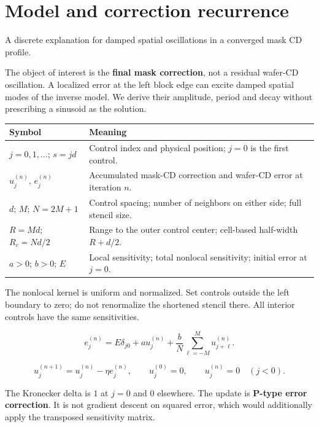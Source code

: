 \documentclass[10pt,a4paper]{article}
\newcommand{\subtitle}[1]{%
  {\small\color{muted}#1\par}\medskip}
\begin{document}
\section{Model and correction recurrence}
\subtitle{A discrete explanation for damped spatial
oscillations in a converged mask CD profile.}

The object of interest is the \textbf{final mask correction},
not a residual wafer-CD oscillation.
A localized error at the left block edge can excite damped
spatial modes of the inverse model.
We derive their amplitude, period and decay without
prescribing a sinusoid as the solution.

\begin{tabularx}{\textwidth}{@{}p{}Y@{}}
\toprule
\textbf{Symbol} & \textbf{Meaning} \\
\midrule
$j=0,1,\ldots$; $s=jd$
&
Control index and physical position;
$j=0$ is the first control.
\\
$u_j^{(n)},\,e_j^{(n)}$
&
Accumulated mask-CD correction and wafer-CD error
at iteration $n$.
\\
$d$; $M$; $N=2M+1$
&
Control spacing; number of neighbors on either side;
full stencil size.
\\
$R=Md$; $R_c=Nd/2$
&
Range to the outer control center;
cell-based half-width $R+d/2$.
\\
$a>0$; $b>0$; $E$
&
Local sensitivity; total nonlocal sensitivity;
initial error at $j=0$.
\\
\bottomrule
\end{tabularx}

The nonlocal kernel is uniform and normalized.
Set controls outside the left boundary to zero;
do not renormalize the shortened stencil there.
All interior controls have the same sensitivities.

\begin{equation}
e_j^{(n)}
=
E\delta_{j0}
+
a u_j^{(n)}
+
\frac{b}{N}
\sum_{\ell=-M}^{M}u_{j+\ell}^{(n)}.
\end{equation}

\begin{equation}
u_j^{(n+1)}
=
u_j^{(n)}-\eta e_j^{(n)},
\qquad
u_j^{(0)}=0,
\qquad
u_j^{(n)}=0\quad(j<0).
\end{equation}

The Kronecker delta is $1$ at $j=0$ and $0$ elsewhere.
The update is \textbf{P-type error correction}.
It is not gradient descent on squared error, which would
additionally apply the transposed sensitivity matrix.
\end{document}
